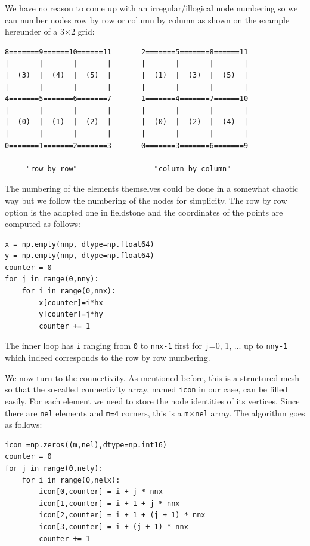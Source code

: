 We have no reason to come up with an irregular/illogical node numbering so 
we can number nodes row by row or column by column as shown on the example 
hereunder of a 3$\times$2 grid:

\begin{verbatim}
8=======9======10======11       2=======5=======8======11
|       |       |       |       |       |       |       |
|  (3)  |  (4)  |  (5)  |       |  (1)  |  (3)  |  (5)  |
|       |       |       |       |       |       |       |
4=======5=======6=======7       1=======4=======7======10
|       |       |       |       |       |       |       |
|  (0)  |  (1)  |  (2)  |       |  (0)  |  (2)  |  (4)  |
|       |       |       |       |       |       |       |
0=======1=======2=======3       0=======3=======6=======9

     "row by row"                  "column by column"
\end{verbatim}

The numbering of the elements themselves could be done in a somewhat chaotic 
way but we follow the numbering of the nodes for simplicity.
The row by row option is the adopted one in fieldstone and the coordinates of the 
points are computed as follows:

\begin{lstlisting}
x = np.empty(nnp, dtype=np.float64)
y = np.empty(nnp, dtype=np.float64)
counter = 0
for j in range(0,nny):
    for i in range(0,nnx):
        x[counter]=i*hx
        y[counter]=j*hy
        counter += 1
\end{lstlisting}
The inner loop has {\tt i} ranging from {\tt 0} to {\tt nnx-1} first for {\tt j}=0, 1, ...
up to {\tt nny-1} which indeed corresponds to the row by row numbering.

We now turn to the connectivity. As mentioned before, this is a structured mesh so that the so-called
connectivity array, named {\tt icon} in our case, can be filled easily. For each element we need
to store the node identities of its vertices. Since there are {\tt nel} elements and {\tt m=4} corners, 
this is a {\tt m}$\times${\tt nel} array. The algorithm goes as follows:

\begin{lstlisting}
icon =np.zeros((m,nel),dtype=np.int16)
counter = 0
for j in range(0,nely):
    for i in range(0,nelx):
        icon[0,counter] = i + j * nnx 
        icon[1,counter] = i + 1 + j * nnx 
        icon[2,counter] = i + 1 + (j + 1) * nnx 
        icon[3,counter] = i + (j + 1) * nnx 
        counter += 1
\end{lstlisting}


